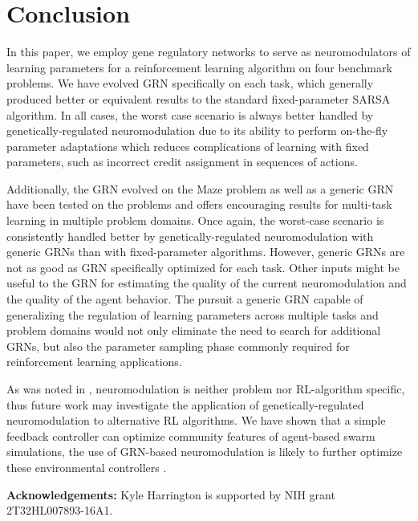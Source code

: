 \section{Conclusion}

In this paper, we employ gene regulatory networks to serve as neuromodulators of learning parameters for a reinforcement learning algorithm on four benchmark problems. We have evolved GRN specifically on each task, which generally produced better or equivalent results to the standard fixed-parameter SARSA algorithm. In all cases, the worst case scenario is always better handled by genetically-regulated neuromodulation due to its ability to perform on-the-fly parameter adaptations which reduces complications of learning with fixed parameters, such as incorrect credit assignment in sequences of actions.

Additionally, the GRN evolved on the Maze problem as well as a generic GRN have been tested on the problems and offers encouraging results for multi-task learning in multiple problem domains. Once again, the worst-case scenario is consistently handled better by genetically-regulated neuromodulation with generic GRNs than with fixed-parameter algorithms. However, generic GRNs are not as good as GRN specifically optimized for each task. Other inputs might be useful to the GRN for estimating the quality of the current neuromodulation and the quality of the agent behavior. The pursuit a generic GRN capable of generalizing the regulation of learning parameters across multiple tasks and problem domains would not only eliminate the need to search for additional GRNs, but also the parameter sampling phase commonly required for reinforcement learning applications.

As was noted in \cite{Schweighofer2003}, neuromodulation is neither problem nor RL-algorithm specific, thus future work may investigate the application of genetically-regulated neuromodulation to alternative RL algorithms. We have shown that a simple feedback controller can optimize community features of agent-based swarm simulations, the use of GRN-based neuromodulation is likely to further optimize these environmental controllers \cite{Gold2014}. \newline


\textbf{Acknowledgements:} Kyle Harrington is supported by NIH grant 2T32HL007893-16A1.

